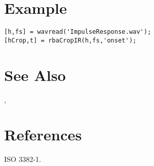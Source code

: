 
\section{Example} %
\label{sec:rbaCropIR_example}

\begin{lstlisting}[style=nonumbers]
[h,fs] = wavread('ImpulseResponse.wav');
[hCrop,t] = rbaCropIR(h,fs,'onset');
\end{lstlisting}


\section{See Also} %
\label{sec:rbaCropIR_see_also}

\texttt{},\quad \texttt{}


\section{References} %
\label{sec:rbaCropIR_references}
ISO 3382-1.



